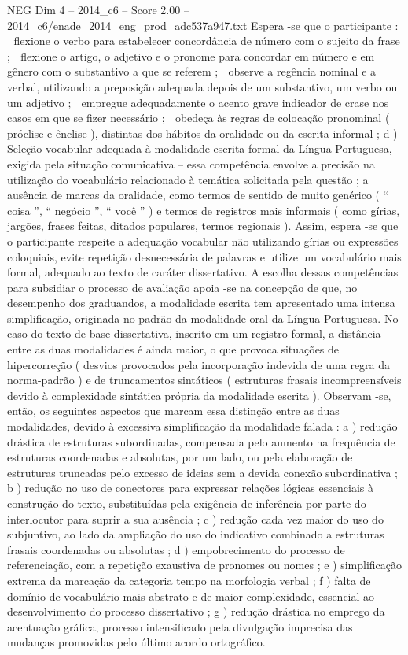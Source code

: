 \begin{textsample}{NEG Dim 4 – 2014\_c6 – Score 2.00 – 2014\_c6/enade\_2014\_eng\_prod\_adc537a947.txt}
Espera -se que o participante :  flexione o verbo para estabelecer concordância de número com o sujeito da frase ;  flexione o artigo, o adjetivo e o pronome para concordar em número e em gênero com o substantivo a que se referem ;  observe a regência nominal e a verbal, utilizando a preposição adequada depois de um substantivo, um verbo ou um adjetivo ;  empregue adequadamente o acento grave indicador de crase nos casos em que se fizer necessário ;  obedeça às regras de colocação pronominal ( próclise e ênclise ), distintas dos hábitos da oralidade ou da escrita informal ; d ) Seleção vocabular adequada à modalidade escrita formal da Língua Portuguesa, exigida pela situação comunicativa – essa competência envolve a precisão na utilização do vocabulário relacionado à temática solicitada pela questão ; a ausência de marcas da oralidade, como termos de sentido de muito genérico ( “ coisa ”, “ negócio ”, “ você ” ) e termos de registros mais informais ( como gírias, jargões, frases feitas, ditados populares, termos regionais ).
Assim, espera -se que o participante respeite a adequação vocabular não utilizando gírias ou expressões coloquiais, evite repetição desnecessária de palavras e utilize um vocabulário mais formal, adequado ao texto de caráter dissertativo.
A escolha dessas competências para subsidiar o processo de avaliação apoia -se na concepção de que, no desempenho dos graduandos, a modalidade escrita tem apresentado uma intensa simplificação, originada no padrão da modalidade oral da Língua Portuguesa.
No caso do texto de base dissertativa, inscrito em um registro formal, a distância entre as duas modalidades é ainda maior, o que provoca situações de hipercorreção ( desvios provocados pela incorporação indevida de uma regra da norma-padrão ) e de truncamentos sintáticos ( estruturas frasais incompreensíveis devido à complexidade sintática própria da modalidade escrita ).
Observam -se, então, os seguintes aspectos que marcam essa distinção entre as duas modalidades, devido à excessiva simplificação da modalidade falada : a ) redução drástica de estruturas subordinadas, compensada pelo aumento na frequência de estruturas coordenadas e absolutas, por um lado, ou pela elaboração de estruturas truncadas pelo excesso de ideias sem a devida conexão subordinativa ; b ) redução no uso de conectores para expressar relações lógicas essenciais à construção do texto, substituídas pela exigência de inferência por parte do interlocutor para suprir a sua ausência ; c ) redução cada vez maior do uso do subjuntivo, ao lado da ampliação do uso do indicativo combinado a estruturas frasais coordenadas ou absolutas ; d ) empobrecimento do processo de referenciação, com a repetição exaustiva de pronomes ou nomes ; e ) simplificação extrema da marcação da categoria tempo na morfologia verbal ; f ) falta de domínio de vocabulário mais abstrato e de maior complexidade, essencial ao desenvolvimento do processo dissertativo ; g ) redução drástica no emprego da acentuação gráfica, processo intensificado pela divulgação imprecisa das mudanças promovidas pelo último acordo ortográfico.

\end{textsample}
